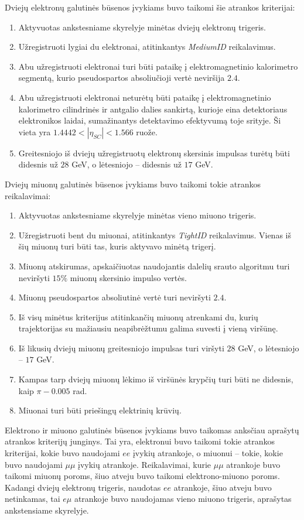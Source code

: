 \documentclass[a4paper, 12pt]{article}
\newcommand{\emu}{e\mu}
\newcommand{\mumu}{\mu\mu}
\begin{document}
Dviejų elektronų galutinės būsenos įvykiams buvo taikomi šie atrankos kriterijai:
\begin{enumerate}
	\item Aktyvuotas ankstesniame skyrelyje minėtas dviejų elektronų trigeris.
	\item Užregistruoti lygiai du elektronai, atitinkantys \textit{MediumID} reikalavimus.
	\item Abu užregistruoti elektronai turi būti pataikę į elektromagnetinio kalorimetro segmentą, kurio
	pseudospartos absoliučioji vertė neviršija $2.4$.
	\item Abu užregistruoti elektronai neturėtų būti pataikę į elektromagnetinio kalorimetro cilindrinės ir
	antgalio dalies sankirtą, kurioje eina detektoriaus elektronikos laidai, sumažinantys detektavimo efektyvumą
	toje srityje. Ši vieta yra $1.4442<|\eta_{SC}|<1.566$ ruože.
	\item Greitesniojo iš dviejų užregistruotų elektronų skersinis impulsas turėtų būti didesnis už $28$ GeV, o
	lėtesniojo -- didesnis už $17$ GeV.
\end{enumerate}

Dviejų miuonų galutinės būsenos įvykiams buvo taikomi tokie atrankos reikalavimai:
\begin{enumerate}
	\item Aktyvuotas ankstesniame skyrelyje minėtas vieno miuono trigeris.
	\item Užregistruoti bent du miuonai, atitinkantys \textit{TightID} reikalavimus. Vienas iš šių miuonų turi būti
	tas, kuris aktyvavo	minėtą trigerį.
	\item Miuonų atskirumas, apskaičiuotas naudojantis dalelių srauto algoritmu turi neviršyti $15\%$ miuonų skersinio
	impulso vertės.
	\item Miuonų pseudospartos absoliutinė vertė turi neviršyti $2.4$.
	\item Iš visų minėtus kriterijus atitinkančių miuonų atrenkami du, kurių trajektorijas su mažiausiu neapibrėžtumu
	galima suvesti į vieną viršūnę.
	\item Iš likusių dviejų miuonų greitesniojo impulsas turi viršyti $28$ GeV, o lėtesniojo -- $17$ GeV.
	\item Kampas tarp dviejų miuonų lėkimo iš viršūnės krypčių turi būti ne didesnis, kaip $\pi - 0.005$ rad.
	\item Miuonai turi būti priešingų elektrinių krūvių.
\end{enumerate}

Elektrono ir miuono galutinės būsenos įvykiams buvo taikomas anksčiau aprašytų atrankos kriterijų junginys.
Tai yra, elektronui buvo taikomi tokie atrankos kriterijai, kokie buvo naudojami $ee$ įvykių atrankoje, o miuonui --
tokie, kokie buvo naudojami $\mumu$ įvykių atrankoje. Reikalavimai, kurie $\mumu$ atrankoje buvo taikomi miuonų poroms,
šiuo atveju buvo taikomi elektrono-miuono poroms.
Kadangi dviejų elektronų trigeris, naudotas $ee$ atrankoje, šiuo atveju buvo netinkamas, tai $\emu$ atrankoje buvo naudojamas
vieno miuono trigeris, aprašytas ankstensiame skyrelyje.
\end{document}
